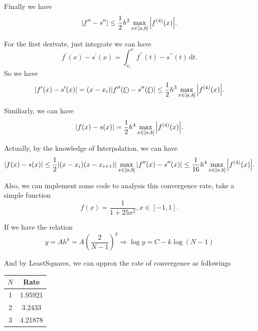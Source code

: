 \documentclass[a4paper]{article}
\begin{document}
Finally we have 
\begin{equation}
    \abs{f^{\prime \prime} - s^{\prime \prime}} \leq \frac{1}{2} h^2 \max_{x \in [a,b]} \abs{f^{(4)}(x)}.
\end{equation}

For the first derivate, just integrate we can have
\begin{equation}
    f^{\prime}(x) - s^{\prime} (x) = \int_{x_i}^{x} f^{\prime \prime}(t) - s^{\prime \prime}(t) \, \mathrm{d}t.
\end{equation}
So we have 
\begin{equation}
    \abs{f^{\prime}(x) - s^{\prime} (x)} = (x - x_i) \abs{f^{\prime \prime}(\xi) - s^{\prime \prime}(\xi)} \leq \frac{1}{2} h^3 \max_{x \in [a,b]} \abs{f^{(4)}(x)}.
\end{equation}

Similiarly, we can have 
\begin{equation}
    \abs{f(x) - s(x)} = \frac{1}{2} h^4 \max_{x \in [a,b]} \abs{f^{(4)}(x)}.
\end{equation}

Actually, by the knowledge of Interpolation, we can have
\begin{equation}
    \abs{f(x) - s(x)} \leq \frac{1}{2} \abs{(x-x_i)(x-x_{i+1})} \max_{x \in [a,b]} \abs{f^{\prime \prime} (x) - s^{\prime \prime} (x)}
    \leq \frac{1}{16} h^4 \max_{x \in [a,b]} \abs{f^{(4)}(x)}.
\end{equation}

Also, we can implement some code to analysis this convergence rate, take a simple function 
\begin{equation}
    f(x) = \frac{1}{1 + 25 x^2}, x\in [-1, 1].
\end{equation}

If we have the relation 
\begin{equation}
    y = A h^k = A (\frac{2}{N-1})^k \Rightarrow \log y = C - k \log (N-1)
\end{equation}

And by LeastSquares, we can approx the rate of convergence as followings 
\begin{table}[H]
    \centering
    \begin{tabular}{|c|c|}
        \hline
        $N$ & Rate \\
        \hline
        1 & 1.95921 \\
        2 & 3.2433 \\
        3 & 4.21878 \\
        \hline
    \end{tabular}
\end{table}
\end{document}
